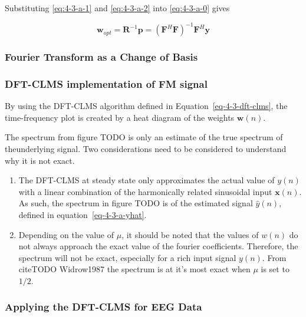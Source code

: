 \documentclass[main.tex]{subfiles}
\begin{document}
Substituting \ref{eq:4-3-a-1} and \ref{eq:4-3-a-2} into \ref{eq:4-3-a-0} gives 

\begin{equation}
\textbf{w}_{opt} = \textbf{R}^{-1}\textbf{p} = (\textbf{F}^H\textbf{F})^{-1}\textbf{F}^H\textbf{y}
\end{equation}

\subsubsection{Fourier Transform as a Change of Basis}

\subsubsection{DFT-CLMS implementation of FM signal}

By using the DFT-CLMS algorithm defined in Equation~\ref{eq-4-3-dft-clms}, the time-frequency plot is created by a heat diagram of the weights $\textbf{w}(n)$. %


The spectrum from figure TODO is only an estimate of the true spectrum of theunderlying signal. Two considerations need to be considered to understand why it is not exact. 

\begin{enumerate}
	\item The DFT-CLMS at steady state only approximates the actual value of $y(n)$ with a linear combination of the harmonically related sinusoidal input $\textbf{x}(n)$. As such, the spectrum in figure TODO is of the estimated signal $\hat{y}(n)$, defined in equation~\ref{eq-4-3-a-yhat}.
	\item Depending on the value of $\mu$, it should be noted that the values of $w(n)$ do not always approach the exact value of the fourier coefficients. Therefore, the spectrum will not be exact, especially for a rich input signal $y(n)$. From cite{TODO Widrow1987} the spectrum is at it's most exact when $\mu$ is set to $1/2$.
\end{enumerate}

\subsubsection{Applying the DFT-CLMS for EEG Data}
\end{document}
